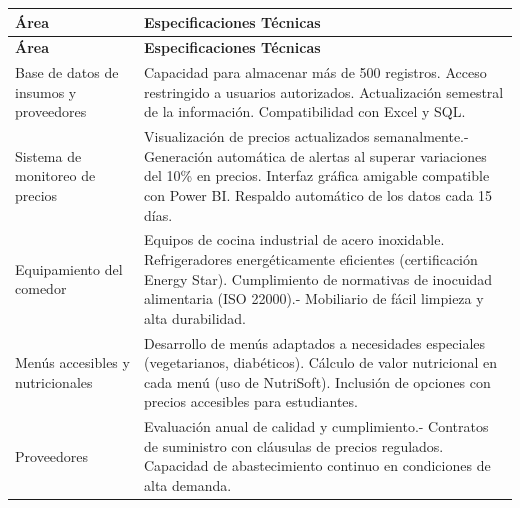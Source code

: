 \documentclass[letterpaper, 11pt]{report}
\begin{document}
\begin{longtable}{|p{.5\linewidth}|p{.5\linewidth}|}
      \hline

      \textbf{Área}                          & \textbf{Especificaciones Técnicas}                        \\
      \hline
      \endfirsthead

      \hline

      \textbf{Área}                          & \textbf{Especificaciones Técnicas}                        \\
      \hline
      \endhead

      Base de datos de insumos y proveedores & Capacidad para almacenar más de 500
      registros. Acceso restringido a usuarios autorizados. Actualización semestral
      de la información. Compatibilidad con Excel y SQL.                                                 \\\hline

      Sistema de monitoreo de precios        & Visualización de precios actualizados
      semanalmente.- Generación automática de alertas al superar variaciones del 10\%
      en precios. Interfaz gráfica amigable compatible con Power BI. Respaldo
      automático de los datos cada 15 días.                                                              \\\hline

      Equipamiento del comedor               & Equipos de cocina industrial de acero inoxidable.
      Refrigeradores energéticamente eficientes (certificación Energy Star).
      Cumplimiento de normativas de inocuidad alimentaria (ISO 22000).- Mobiliario de
      fácil limpieza y alta durabilidad.                                                                 \\\hline

      Menús accesibles y nutricionales       & Desarrollo de menús adaptados a necesidades
      especiales (vegetarianos, diabéticos). Cálculo de valor nutricional en cada
      menú (uso de NutriSoft). Inclusión de opciones con precios accesibles para
      estudiantes.                                                                                       \\\hline

      Proveedores                            & Evaluación anual de calidad y cumplimiento.- Contratos de
      suministro con cláusulas de precios regulados. Capacidad de abastecimiento
      continuo en condiciones de alta demanda.                                                           \\\hline
\end{longtable}
\end{document}
